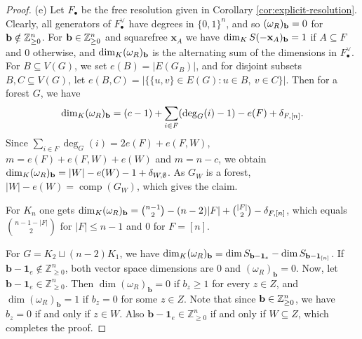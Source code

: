 \documentclass[12pt]{amsart}
\begin{document}
\begin{proof}
(e) Let $F_\bullet$ be the free resolution given in Corollary \ref{cor:explicit-resolution}. Clearly, all generators of $F_\bullet^\vee$ have degrees in $\{0,1\}^n$, and so $(\omega_R)_{{\bf b}}=0$ for ${\bf b}\notin\mathbb Z_{\ge0}^n$.
For ${\bf b}\in\mathbb Z_{\ge0}^n$ and squarefree $\mathbf x_A$ we have $\dim_KS(-\mathbf x_A)_{{\bf b}}=1$ if $A\subseteq F$ and $0$ otherwise,
and $\dim_K(\omega_R)_{{\bf b}}$ is the alternating sum of the dimensions in $F_\bullet^\vee$. For $B\subseteq V(G)$, we set $e(B)=|E(G_B)|$, and for disjoint subsets $B,C\subseteq V(G)$, let
$e(B,C)=|\{\{u,v\}\in E(G):u\in B,\ v\in C\}|$.
Then for a forest $G$, we have
\[
\dim_K(\omega_R)_{{\bf b}}=(c-1)+\sum_{i\in F}(\deg_G(i)-1)-e(F)+\delta_{F,[n]} .
\]
Since $\sum_{i\in F}\deg_G(i)=2e(F)+e(F,W)$, $m=e(F)+e(F,W)+e(W)$ and $m=n-c$, we obtain 
$\dim_K(\omega_R)_{{\bf b}}=|W|-e(W)-1+\delta_{W,\emptyset}$. As $G_W$ is a forest, $|W|-e(W)=\operatorname{comp}(G_W)$, which gives the claim.

For $K_n$ one gets
$\dim_K(\omega_R)_{{\bf b}}=\binom{n-1}{2}-(n-2)|F|+\binom {|F|}{2}-\delta_{F,[n]}$, which equals $\binom{n-1-|F|}{2}$ for
$|F|\le n-1$ and $0$ for $F=[n]$.

For $G=K_2\sqcup (n-2)K_1$, we have $\dim_K(\omega_R)_{{\bf b}}=\dim S_{\mathbf b-\mathbf 1_e}-\dim S_{\mathbf b-\mathbf 1_{[n]}}$.
If $\mathbf b-\mathbf 1_e\notin\mathbb Z_{\ge0}^n$, both vector space dimensions are $0$ and $(\omega_R)_{\mathbf b}=0$.
Now, let $\mathbf b-\mathbf 1_e\in\mathbb Z_{\ge0}^n$. Then $\dim(\omega_R)_{\mathbf b}=0$ if $b_z\ge1$ for every $z\in Z$, and $\dim(\omega_R)_{\mathbf b}=1$ if $b_z=0$ for some $z\in Z$. Note that since ${\bf b}\in\mathbb Z_{\ge0}^n$, we have $b_z=0$ if and only if $z\in W$. Also  $\mathbf b-\mathbf 1_e\in\mathbb Z_{\ge0}^n$ if and only if $W\subseteq Z$, which completes the proof.
\end{proof}
\end{document}

